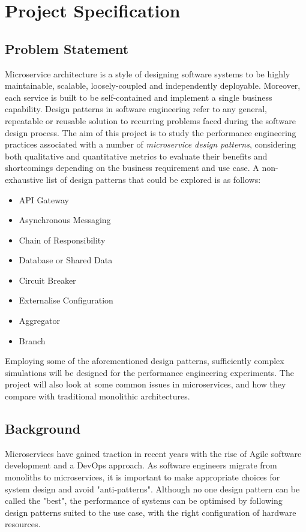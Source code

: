\chapter{Project Specification}

\section{Problem Statement}
Microservice architecture is a style of designing software systems to be highly maintainable, scalable, loosely-coupled and independently deployable. Moreover, each service is built to be self-contained and implement a single business capability. Design patterns in software engineering refer to any general, repeatable or reusable solution to recurring problems faced during the software design process. The aim of this project is to study the performance engineering practices associated with a number of \textit{microservice design patterns}, considering both qualitative and quantitative metrics to evaluate their benefits and shortcomings depending on the business requirement and use case. A non-exhaustive list of design patterns that could be explored is as follows:

\begin{itemize}
	\item API Gateway
	\item Asynchronous Messaging
	\item Chain of Responsibility
	\item Database or Shared Data
	\item Circuit Breaker
	\item Externalise Configuration
	\item Aggregator
	\item Branch
\end{itemize}

Employing some of the aforementioned design patterns, sufficiently complex simulations will be designed for the performance engineering experiments. The project will also look at some common issues in microservices, and how they compare with traditional monolithic architectures.

\pagebreak
\section{Background}
Microservices have gained traction in recent years with the rise of Agile software development and a DevOps \cite{awsDevOps} approach. As software engineers migrate from monoliths to microservices, it is important to make appropriate choices for system design and avoid "anti-patterns". Although no one design pattern can be called the "best", the performance of systems can be optimised by following design patterns suited to the use case, with the right configuration of hardware resources.

